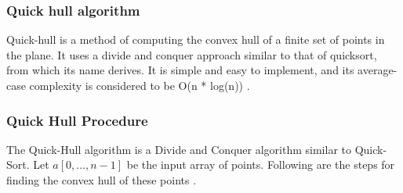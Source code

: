 \subsubsection{Quick hull algorithm}
Quick-hull is a method of computing the convex hull of a finite set of points in the
plane. It uses a divide and conquer approach similar to that of quicksort, from which
its name derives. It is simple and easy to implement, and its average-case complexity
is considered to be O(n * log(n)) \cite{3.2}.
\subsubsection*{Quick Hull Procedure}
The Quick-Hull algorithm is a Divide and Conquer algorithm similar to Quick-Sort. Let
$a[0,\ldots, n-1]$ be the input array of points. Following are the steps for finding the convex
hull of these points \cite{3.3}.
